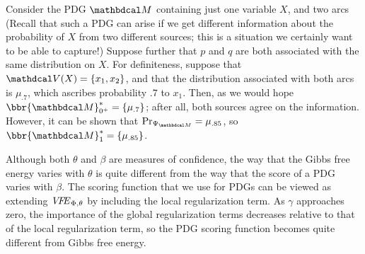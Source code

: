 \begin{example}\label{ex:overdet}
Consider the PDG $\dg M$ containing just one variable
    $X$, and two arcs
(Recall that such a PDG can arise if we get different information about the probability of $X$ from two different sources; this is a situation we certainly want to be able to capture!)
Suppose further that $p$ and $q$ are both associated with the same distribution on $X$.
For definiteness, suppose that
$\V(X) = \{x_1,x_2\}$, and
that the distribution associated with both arcs is $\mu_{.7}$, which ascribes
probability $.7$ to $x_1$. Then, as we would hope  $\bbr{\dg M}^*_{0^+} =
\{\mu_{.7}\}$; after all, both sources agree on the information.
However, it can be shown that 
$\Pr_{\WFGof{\dg M}} = \mu_{.85}$, so  $\bbr{\dg M}_1^* = \{\mu_{.85}\}$.


\end{example}


Although both $\theta$ and $\beta$ are measures of confidence, 
the way that the Gibbs free energy varies with $\theta$ 
is quite different from the way that the score of a PDG
varies with $\beta$. 
The scoring function that we use for PDGs can be viewed as
extending ${\mathit{V\mkern-4mu F\mkern-4.5mu E}}_{\Phi,\theta}$ by including
the local regularization term.
As $\gamma$ approaches zero,
the importance of the global regularization terms decreases relative
to that of the local regularization term, so the PDG scoring function
becomes quite different from Gibbs free energy.

